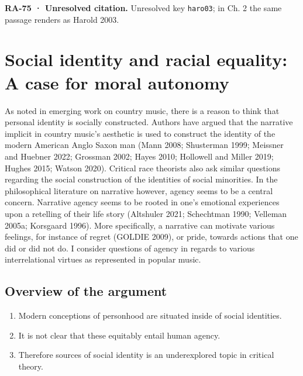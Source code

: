 \documentclass[
  letterpaper,
  DIV=11,
  numbers=noendperiod]{scrartcl}
\providecommand{\tightlist}{%
  \setlength{\itemsep}{0pt}\setlength{\parskip}{0pt}}
\theoremstyle{remark}
\begin{document}
\begin{tcolorbox}[enhanced jigsaw, arc=.35mm, bottomrule=.15mm, bottomtitle=1mm, breakable, colback=white, colbacktitle=quarto-callout-warning-color!10!white, colframe=quarto-callout-warning-color-frame, coltitle=black, left=2mm, leftrule=.75mm, opacityback=0, opacitybacktitle=0.6, rightrule=.15mm, title=\textcolor{quarto-callout-warning-color}{\faExclamationTriangle}\hspace{0.5em}{Warning}, titlerule=0mm, toprule=.15mm, toptitle=1mm]

\textbf{RA-75 · Unresolved citation.} Unresolved key \texttt{haro03}; in
Ch. 2 the same passage renders as Harold 2003.

\end{tcolorbox}

\section{Social identity and racial equality: A case for moral
autonomy}\label{social-identity-and-racial-equality-a-case-for-moral-autonomy}

As noted in emerging work on country music, there is a reason to think
that personal identity is socially constructed. Authors have argued that
the narrative implicit in country music's aesthetic is used to construct
the identity of the modern American Anglo Saxon man (Mann 2008;
Shusterman 1999; Meissner and Huebner 2022; Grossman 2002; Hayes 2010;
Hollowell and Miller 2019; Hughes 2015; Watson 2020). Critical race
theorists also ask similar questions regarding the social construction
of the identities of social minorities. In the philosophical literature
on narrative however, agency seems to be a central concern. Narrative
agency seems to be rooted in one's emotional experiences upon a
retelling of their life story (Altshuler 2021; Schechtman 1990; Velleman
2005a; Korsgaard 1996). More specifically, a narrative can motivate
various feelings, for instance of regret (GOLDIE 2009), or pride,
towards actions that one did or did not do. I consider questions of
agency in regards to various interrelational virtues as represented in
popular music.

\subsection{Overview of the argument}\label{overview-of-the-argument}

\begin{enumerate}
\def\labelenumi{\arabic{enumi}.}
\tightlist
\item
  Modern conceptions of personhood are situated inside of social
  identities.
\item
  It is not clear that these equitably entail human agency.
\item
  Therefore sources of social identity is an underexplored topic in
  critical theory.
\end{enumerate}
\end{document}
